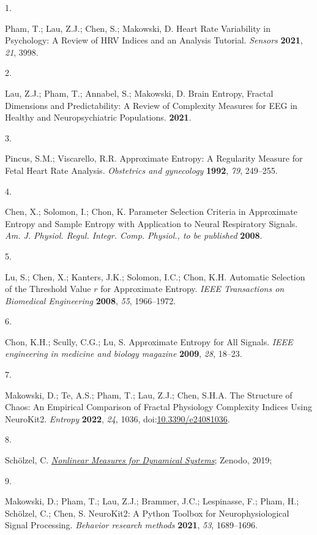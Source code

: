 \documentclass[
  man,floatsintext]{apa6}
\newlength{\cslhangindent}
\newlength{\csllabelwidth}
\newlength{\cslentryspacingunit} %
\newenvironment{CSLReferences}[2] %
 {%
  \setlength{\parindent}{0pt}
  \ifodd #1
  \let\oldpar\par
  \def\par{\hangindent=\cslhangindent\oldpar}
  \fi
  \setlength{\parskip}{#2\cslentryspacingunit}
 }%
 {}
\newcommand{\CSLLeftMargin}[1]{\parbox[t]{\csllabelwidth}{#1}}
\newcommand{\CSLRightInline}[1]{\parbox[t]{\linewidth - \csllabelwidth}{#1}\break}
\begin{document}
\hypertarget{refs}{}
\begin{CSLReferences}{0}{0}
\leavevmode{}%
\CSLLeftMargin{1. }%
\CSLRightInline{Pham, T.; Lau, Z.J.; Chen, S.; Makowski, D. Heart Rate Variability in Psychology: A Review of HRV Indices and an Analysis Tutorial. \emph{Sensors} \textbf{2021}, \emph{21}, 3998.}

\leavevmode{}%
\CSLLeftMargin{2. }%
\CSLRightInline{Lau, Z.J.; Pham, T.; Annabel, S.; Makowski, D. Brain Entropy, Fractal Dimensions and Predictability: A Review of Complexity Measures for EEG in Healthy and Neuropsychiatric Populations. \textbf{2021}.}

\leavevmode{}%
\CSLLeftMargin{3. }%
\CSLRightInline{Pincus, S.M.; Viscarello, R.R. Approximate Entropy: A Regularity Measure for Fetal Heart Rate Analysis. \emph{Obstetrics and gynecology} \textbf{1992}, \emph{79}, 249--255.}

\leavevmode{}%
\CSLLeftMargin{4. }%
\CSLRightInline{Chen, X.; Solomon, I.; Chon, K. Parameter Selection Criteria in Approximate Entropy and Sample Entropy with Application to Neural Respiratory Signals. \emph{Am. J. Physiol. Regul. Integr. Comp. Physiol., to be published} \textbf{2008}.}

\leavevmode{}%
\CSLLeftMargin{5. }%
\CSLRightInline{Lu, S.; Chen, X.; Kanters, J.K.; Solomon, I.C.; Chon, K.H. Automatic Selection of the Threshold Value \(r\) for Approximate Entropy. \emph{IEEE Transactions on Biomedical Engineering} \textbf{2008}, \emph{55}, 1966--1972.}

\leavevmode{}%
\CSLLeftMargin{6. }%
\CSLRightInline{Chon, K.H.; Scully, C.G.; Lu, S. Approximate Entropy for All Signals. \emph{IEEE engineering in medicine and biology magazine} \textbf{2009}, \emph{28}, 18--23.}

\leavevmode{}%
\CSLLeftMargin{7. }%
\CSLRightInline{Makowski, D.; Te, A.S.; Pham, T.; Lau, Z.J.; Chen, S.H.A. The Structure of Chaos: An Empirical Comparison of Fractal Physiology Complexity Indices Using {NeuroKit}2. \emph{Entropy} \textbf{2022}, \emph{24}, 1036, doi:\href{https://doi.org/10.3390/e24081036}{10.3390/e24081036}.}

\leavevmode{}%
\CSLLeftMargin{8. }%
\CSLRightInline{Schölzel, C. \emph{\href{https://doi.org/10.5281/zenodo.3814723}{Nonlinear Measures for Dynamical Systems}}; Zenodo, 2019;}

\leavevmode{}%
\CSLLeftMargin{9. }%
\CSLRightInline{Makowski, D.; Pham, T.; Lau, Z.J.; Brammer, J.C.; Lespinasse, F.; Pham, H.; Schölzel, C.; Chen, S. NeuroKit2: A Python Toolbox for Neurophysiological Signal Processing. \emph{Behavior research methods} \textbf{2021}, \emph{53}, 1689--1696.}

\end{CSLReferences}


\clearpage
\renewcommand{\listfigurename}{Figure captions}
\end{document}
